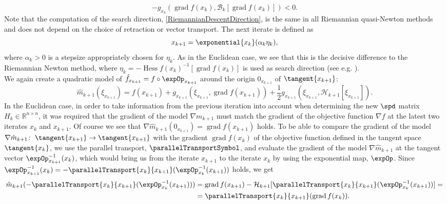 \begin{equation*}
    - g_{x_k} (\operatorname{grad} f(x_k), \mathcal{B}_k [\operatorname{grad} f(x_k)]) < 0.
\end{equation*}
Note that the computation of the search direction, \cref{RiemannianDescentDirection}, is the same in all Riemannian quasi-Newton methods and does not depend on the choice of retraction or vector transport. The next iterate is defined as 
\begin{equation*}
    x_{k+1} = \exponential{x_k}(\alpha_k \eta_k),
\end{equation*}
where $\alpha_k > 0$ is a stepsize appropriately chosen for $\eta_k$. As in the Euclidean case, we see that this is the decisive difference to the Riemannian Newton method, where $\eta_k = - {\operatorname{Hess} f(x_k)}^{-1}[\operatorname{grad} f(x_k)]$ is used as search direction (see e.g. \cite[p.~113]{AbsilMahonySepulchre:2008}). \\
We again create a quadratic model of $\hat{f}_{x_{k+1}} = f \circ \expOp_{x_{k+1}}$ around the origin $0_{x_{k+1}}$ of $\tangent{x_{k+1}}$:
\begin{equation*}
    \hat{m}_{k+1}(\xi_{x_{k+1}}) = f(x_{k+1}) + g_{x_{k+1}} (\xi_{x_{k+1}}, \operatorname{grad} f(x_{k+1})) + \frac{1}{2} g_{x_{k+1}} (\xi_{x_{k+1}}, \mathcal{H}_{k+1}[\xi_{x_{k+1}}]).
\end{equation*}
In the Euclidean case, in order to take information from the previous iteration into account when determining the new $\spd$ matrix $H_k \in \mathbb{R}^{n \times n}$, it was required that the gradient of the model $\nabla m_{k+1}$ must match the gradient of the objective function $\nabla f$ at the latest two iterates $x_k$ and $x_{k+1}$. Of course we see that $\nabla \hat{m}_{k+1}(0_{x_{k+1}}) = \operatorname{grad} f(x_{k+1})$ holds. To be able to compare the gradient of the model $\nabla \hat{m}_{k+1} \colon \; \tangent{x_{k+1}} \to \tangent{x_{k+1}}$ with the gradient $\operatorname{grad} f(x_k)$ of the objective function defined in the tangent space $\tangent{x_k}$, we use the parallel transport, $\parallelTransportSymbol$, and evaluate the gradient of the model $\nabla \hat{m}_{k+1}$ at the tangent vector ${\expOp}^{-1}_{x_{k+1}}(x_k)$, which would bring us from the iterate $x_{k+1}$ to the iterate $x_k$ by using the exponential map, $\expOp$. Since ${\expOp}^{-1}_{x_{k+1}}(x_k) = - \parallelTransport{x_k}{x_{k+1}} ({\expOp}^{-1}_{x_k}(x_{k+1}))$ holds, we get 
\begin{equation*}
    \begin{split}
        \hat{m}_{k+1}(- \parallelTransport{x_k}{x_{k+1}}( {\expOp}^{-1}_{x_k}(x_{k+1}) )) & = \operatorname{grad} f(x_{k+1}) - \mathcal{H}_{k+1}[\parallelTransport{x_k}{x_{k+1}}( {\expOp}^{-1}_{x_k}(x_{k+1}) )] = \\ & = \parallelTransport{x_k}{x_{k+1}}(\operatorname{grad} f(x_k)).
    \end{split}
\end{equation*}
